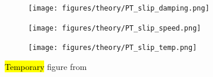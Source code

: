 \begin{figure}[H]
  \centering
  \begin{subfigure}[t]{0.32\textwidth}
      \centering
      \texttt{[image: figures/theory/PT\_slip\_damping.png]}
      \caption{}
  \end{subfigure}
  \hfill
  \begin{subfigure}[t]{0.32\textwidth}
      \centering
      \texttt{[image: figures/theory/PT\_slip\_speed.png]}
      \caption{}
  \end{subfigure}
  \hfill
  \begin{subfigure}[t]{0.32\textwidth}
      \centering
      \texttt{[image: figures/theory/PT\_slip\_temp.png]}
      \caption{}
  \end{subfigure}
  \hfill
     \caption{\hl{Temporary} figure from \cite{Yalin_2011}}
     \label{fig:PT_slip_var}
\end{figure}














